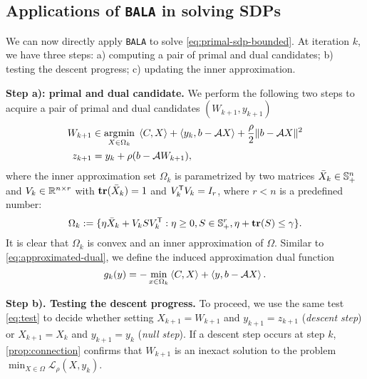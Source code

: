 \documentclass[11pt]{article}
\newcommand{\alg}{\texttt{BALA}}%
\begin{document}
\subsection{Applications of \alg{} in solving SDPs}

We can now directly apply \alg{} to solve \cref{eq:primal-sdp-bounded}. At iteration $k$, we have three steps: a) computing a pair of primal and dual candidates; b) testing the descent progress; c) updating the inner approximation. 

\vspace{3pt}
\noindent \textbf{Step a): primal and dual candidate.} We perform the following two steps to acquire a pair of primal and dual candidates $(W_{k+1},y_{k+1})$ 
\begin{equation}
    \label{eq:SBM-dual-subproblem}
    \begin{aligned}
        W_{k+1} & \in \operatorname*{\arg\!\min}_{X\in \Omega_k} \; \left \langle C, X \right\rangle + \left \langle y_k, b-\mathcal{A} X \right\rangle + \frac{\rho}{2}\|b - \mathcal{A} X\|^2  \\
        z_{k+1}       & = y_k + \rho (b - \mathcal{A} W_{k+1}),
    \end{aligned}
\end{equation}
where the inner approximation set $\Omega_{k}$ is parametrized by two matrices $\Bar{X}_k \in \mathbb{S}^n_+$ and $V_k \in \mathbb{R}^{n \times r}$ with $\mathop{\bf tr}(\Bar{X}_k) = 1$ and $V_k^{\mathsf{ T}} V_k = I_{r}$, where $r < n$ is a predefined number: 
$$
\Omega_k := \{\eta \Bar{X}_k + V_k S V_k^{\mathsf{ T}} : \eta \geq 0, S \in \mathbb{S}_+^r, \eta + \mathop{\bf tr}(S) \leq \gamma\}.
$$
It is clear that $\Omega_k$ is convex and an inner approximation of $\Omega$. Similar to \cref{eq:approximated-dual}, we define the induced approximation dual function 
\begin{equation}
\label{eq:approximated-dual-sdp}
g_k(y) = - \min_{x\in\Omega_k} \left \langle C, X \right\rangle + \left \langle y, b-\mathcal{A} X  \right\rangle. 
\end{equation}

\vspace{3pt}
\noindent \textbf{Step b). Testing the descent progress.} To proceed, we use the same test \cref{eq:test} to decide whether setting $X_{k+1} = W_{k+1}$ and $y_{k+1} = z_{k+1}$ (\textit{descent step}) or $X_{k+1} = X_{k}$ and $y_{k+1} = y_{k}$ (\textit{null step}). If a descent step occurs at step $k$, \cref{prop:connection} confirms that $W_{k+1}$ is an inexact solution to the problem $\min_{X \in \Omega} \mathcal{L}_{\rho}(X,y_k)$. 
\end{document}
